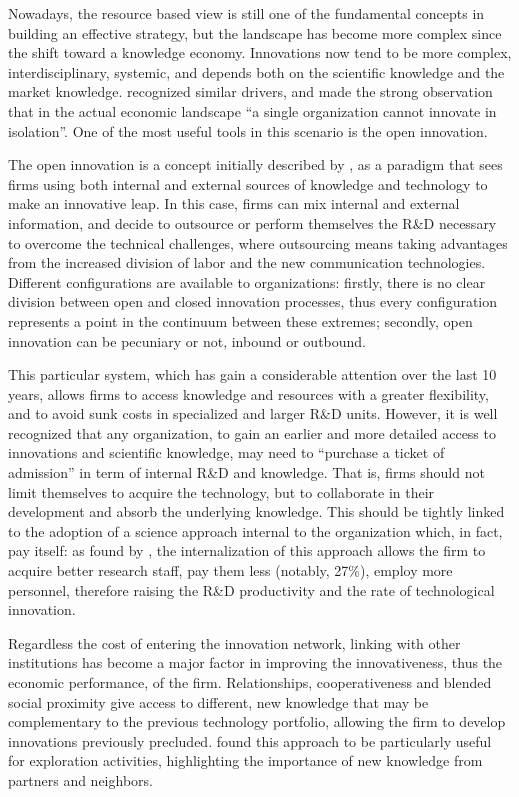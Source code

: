 Nowadays, the resource based view is still one of the fundamental concepts in building an effective strategy, but the landscape has become more complex since the shift toward a knowledge economy. Innovations now tend to be more complex, interdisciplinary, systemic, and depends both on the scientific knowledge and the market knowledge. \citet{Dahlander2010} recognized similar drivers, and made the strong observation that in the actual economic landscape \enquote{a single organization cannot innovate in isolation}. One of the most useful tools in this scenario is the open innovation.

The open innovation is a concept initially described by \citet{Chesbrough2003}, as a paradigm that sees firms using both internal and external sources of knowledge and technology to make an innovative leap. In this case, firms can mix internal and external information, and decide to outsource or perform themselves the R\&D necessary to overcome the technical challenges, where outsourcing  means taking advantages from the increased division of labor and the new communication technologies. Different configurations are available to organizations: firstly, there is no clear division between open and closed innovation processes, thus every configuration represents a point in the continuum between these extremes; secondly, open innovation can be pecuniary or not, inbound or outbound. 

This particular system, which has gain a considerable attention over the last 10 years, allows firms to access knowledge and resources with a greater flexibility, and to avoid sunk costs in specialized and larger R\&D units. However, it is well recognized that any organization, to gain an earlier and more detailed access to innovations and scientific knowledge, may need to \enquote{purchase a ticket of admission} in term of internal R\&D and knowledge. That is, firms should not limit themselves to acquire the technology, but to collaborate in their development and absorb the underlying knowledge. This should be tightly linked to the adoption of a science approach internal to the organization which, in fact, pay itself: as found by \citet{Stern2004}, the internalization of this approach allows the firm to acquire better research staff, pay them less (notably, 27\%), employ more personnel, therefore raising the R\&D productivity and the rate of technological innovation. 

Regardless the cost of entering the innovation network, linking with other institutions has become a major factor in improving the innovativeness, thus the economic performance, of the firm. Relationships, cooperativeness and blended social proximity give access to different, new knowledge that may be complementary to the previous technology portfolio, allowing the firm to develop innovations previously precluded. \citet{Bercovitz2006} found this approach to be particularly useful for exploration activities, highlighting the importance of new knowledge from partners and neighbors.

